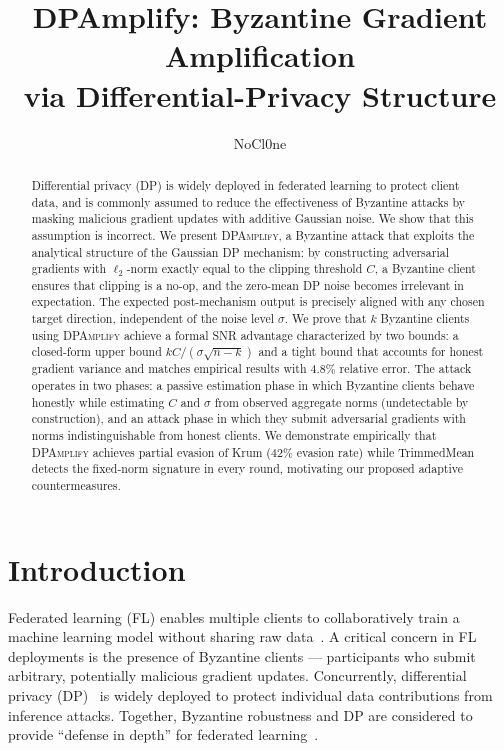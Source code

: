 \documentclass[conference]{IEEEtran}
\title{DPAmplify: Byzantine Gradient Amplification\\via Differential-Privacy Structure}
\author{NoCl0ne}
\begin{document}
\maketitle

\begin{abstract}
Differential privacy (DP) is widely deployed in
federated learning to protect client data, and is
commonly assumed to reduce the effectiveness of
Byzantine attacks by masking malicious gradient
updates with additive Gaussian noise. We show that
this assumption is incorrect. We present
\textsc{DPAmplify}, a Byzantine attack that exploits
the analytical structure of the Gaussian DP
mechanism: by constructing adversarial gradients
with $\ell_2$-norm exactly equal to the clipping
threshold $C$, a Byzantine client ensures that
clipping is a no-op, and the zero-mean DP noise
becomes irrelevant in expectation. The expected
post-mechanism output is precisely aligned with any
chosen target direction, independent of the noise
level $\sigma$. We prove that $k$ Byzantine clients
using \textsc{DPAmplify} achieve a formal SNR
advantage characterized by two bounds: a closed-form
upper bound $kC/(\sigma\sqrt{n-k})$ and a tight bound
that accounts for honest gradient variance and matches
empirical results with 4.8\% relative error. The
attack operates in two phases: a passive estimation
phase in which Byzantine clients behave honestly
while estimating $C$ and $\sigma$ from observed
aggregate norms (undetectable by construction), and
an attack phase in which they submit adversarial
gradients with norms indistinguishable from honest
clients. We demonstrate empirically that
\textsc{DPAmplify} achieves partial evasion of Krum
(42\% evasion rate) while TrimmedMean detects the
fixed-norm signature in every round, motivating our
proposed adaptive countermeasures.
\end{abstract}

\section{Introduction}

Federated learning (FL) enables multiple clients to
collaboratively train a machine learning model without
sharing raw data~\cite{mcmahan2017communication}.
A critical concern in FL deployments is the presence
of Byzantine clients --- participants who submit
arbitrary, potentially malicious gradient updates.
Concurrently, differential privacy
(DP)~\cite{abadi2016deep} is widely deployed to
protect individual data contributions from inference
attacks. Together, Byzantine robustness and DP are
considered to provide ``defense in depth'' for
federated learning~\cite{yin2018byzantine}.
\end{document}
